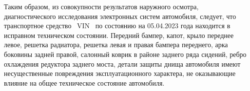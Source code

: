 Таким образом, из совокупности результатов наружного осмотра,
 диагностического исследования электронных систем автомобиля, следует, что транспортное средство  \, VIN \vin \, по состоянию на 05.04.2023 года находится в исправном техническом состоянии. Передний бампер, капот, крыло переднее левое, решетка радиатора, решетка левая и правая бампера переднего, арка боковины задней правой, салонный коврик в районе заднего ряда сидений, ребро охлаждения редуктора заднего моста, детали защиты днища автомобиля имеют несущественные повреждения эксплуатационного характера, не оказывающие влияние на общее техническое состояние автомобиля. \\
  

%


